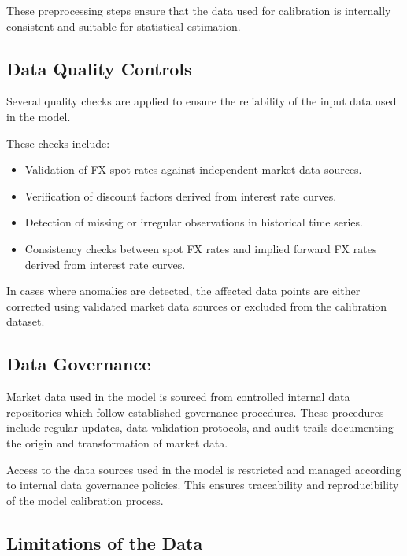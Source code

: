 These preprocessing steps ensure that the data used for calibration is internally consistent and suitable for statistical estimation.

\subsection{Data Quality Controls}

Several quality checks are applied to ensure the reliability of the input data used in the model.

These checks include:

\begin{itemize}
	
	\item Validation of FX spot rates against independent market data sources.
	
	\item Verification of discount factors derived from interest rate curves.
	
	\item Detection of missing or irregular observations in historical time series.
	
 
	
	\item Consistency checks between spot FX rates and implied forward FX rates derived from interest rate curves.
	
\end{itemize}

In cases where anomalies are detected, the affected data points are either corrected using validated market data sources or excluded from the calibration dataset.

\subsection{Data Governance}

Market data used in the model is sourced from controlled internal data repositories which follow established governance procedures. These procedures include regular updates, data validation protocols, and audit trails documenting the origin and transformation of market data.

Access to the data sources used in the model is restricted and managed according to internal data governance policies. This ensures traceability and reproducibility of the model calibration process.

\subsection{Limitations of the Data}

